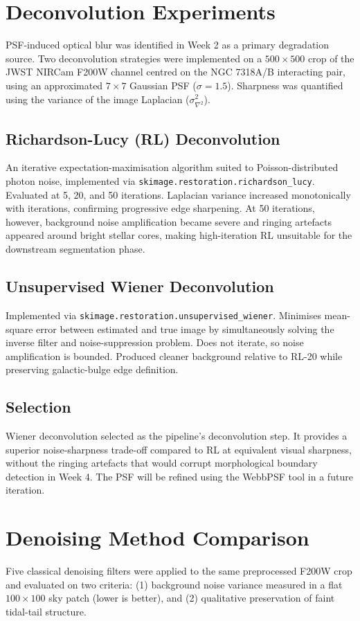\documentclass[11pt]{article}
\begin{document}
\section{Deconvolution Experiments}
PSF-induced optical blur was identified in Week 2 as a primary degradation source. Two deconvolution strategies were implemented on a $500 \times 500$ crop of the JWST NIRCam F200W channel centred on the NGC 7318A/B interacting pair, using an approximated $7 \times 7$ Gaussian PSF ($\sigma = 1.5$). Sharpness was quantified using the variance of the image Laplacian ($\sigma^2_{\nabla^2}$).

\subsection{Richardson-Lucy (RL) Deconvolution}
An iterative expectation-maximisation algorithm suited to Poisson-distributed photon noise, implemented via \texttt{skimage.restoration.richardson\_lucy}. Evaluated at 5, 20, and 50 iterations. Laplacian variance increased monotonically with iterations, confirming progressive edge sharpening. At 50 iterations, however, background noise amplification became severe and ringing artefacts appeared around bright stellar cores, making high-iteration RL unsuitable for the downstream segmentation phase.

\subsection{Unsupervised Wiener Deconvolution}
Implemented via \texttt{skimage.restoration.unsupervised\_wiener}. Minimises mean-square error between estimated and true image by simultaneously solving the inverse filter and noise-suppression problem. Does not iterate, so noise amplification is bounded. Produced cleaner background relative to RL-20 while preserving galactic-bulge edge definition.

\subsection{Selection}
Wiener deconvolution selected as the pipeline's deconvolution step. It provides a superior noise-sharpness trade-off compared to RL at equivalent visual sharpness, without the ringing artefacts that would corrupt morphological boundary detection in Week 4. The PSF will be refined using the WebbPSF tool in a future iteration.

\section{Denoising Method Comparison}
Five classical denoising filters were applied to the same preprocessed F200W crop and evaluated on two criteria: (1) background noise variance measured in a flat $100 \times 100$ sky patch (lower is better), and (2) qualitative preservation of faint tidal-tail structure.
\end{document}
